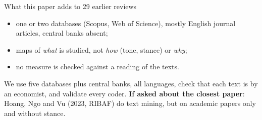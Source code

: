 \documentclass[aspectratio=169,10pt]{beamer}
\begin{document}
\begin{frame}{What this paper adds to 29 earlier reviews}
{\begin{itemize}
\item one or two databases (Scopus, Web of Science), mostly English journal articles, central banks absent;
\item maps of \emph{what} is studied, not \emph{how} (tone, stance) or \emph{why};
\item no measure is checked against a reading of the texts.
\end{itemize}
We use five databases plus central banks, all languages, check that each text is by an economist, and validate every coder.
\textbf{If asked about the closest paper}: Hoang, Ngo and Vu (2023, RIBAF) do text mining, but on academic papers only and without stance.}
\end{frame}

\end{document}
